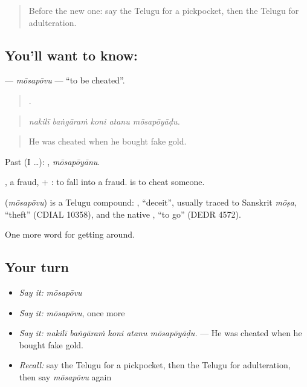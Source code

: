\begin{quote}
Before the new one: say the Telugu for a pickpocket, then the Telugu for adulteration.
\end{quote}

\subsection*{You'll want to know: }
\textbf{} — \emph{mōsapōvu} — \textquotedblleft{}to be cheated\textquotedblright{}.

\begin{quote}
    .
\end{quote}

\begin{quote}
\emph{nakilī baṅgāraṁ koni atanu mōsapōyāḍu.}
\end{quote}

\begin{quote}
He was cheated when he bought fake gold.
\end{quote}

Past (I …): , \emph{mōsapōyānu}.

, a fraud, + : to fall into a fraud.   is to cheat someone.

\begin{cousinweb}
\textbf{} (\emph{mōsapōvu}) is a Telugu compound: , \textquotedblleft{}deceit\textquotedblright{}, usually traced to Sanskrit \emph{mōṣa}, \textquotedblleft{}theft\textquotedblright{} (CDIAL 10358), and the native , \textquotedblleft{}to go\textquotedblright{} (DEDR 4572).
\end{cousinweb}

\begin{grammarlens}[title={What you've built}]
One more word for getting around.
\end{grammarlens}

\subsection*{Your turn}
\begin{itemize}
\raggedright
  \item \emph{Say it:} \emph{mōsapōvu}
  \item \emph{Say it:} \emph{mōsapōvu}, once more
  \item \emph{Say it:} \emph{nakilī baṅgāraṁ koni atanu mōsapōyāḍu.} — He was cheated when he bought fake gold.
  \item \emph{Recall:} say the Telugu for a pickpocket, then the Telugu for adulteration, then say \emph{mōsapōvu} again
\end{itemize}

